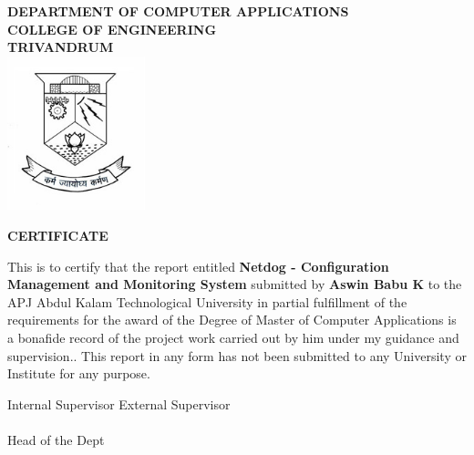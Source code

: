 \begin{titlepage}
\begin{center}

\textbf{DEPARTMENT OF COMPUTER APPLICATIONS}\\[0.5cm]
\textbf{ COLLEGE OF ENGINEERING \\ TRIVANDRUM}\\
[0.5cm]

\vspace{1.2cm}
\includegraphics[width=0.30\textwidth]{2.jpg}\\
\vspace{0.8cm}

\textbf{CERTIFICATE}\\
\end{center}

This is to certify that the report entitled 
\textbf{Netdog - Configuration Management and Monitoring System} submitted by
\textbf{Aswin Babu K} to the APJ Abdul Kalam Technological University in partial
fulfillment of the requirements for the award of the Degree of Master of
Computer Applications is a bonafide record of the project work carried out by
him under my guidance and supervision.. This report in any form has not been
submitted to any University or Institute for any purpose.

\vspace{1 cm}

\noindent Internal Supervisor 
\hfill External Supervisor
\\ \\
Head of the Dept

\end{titlepage}
